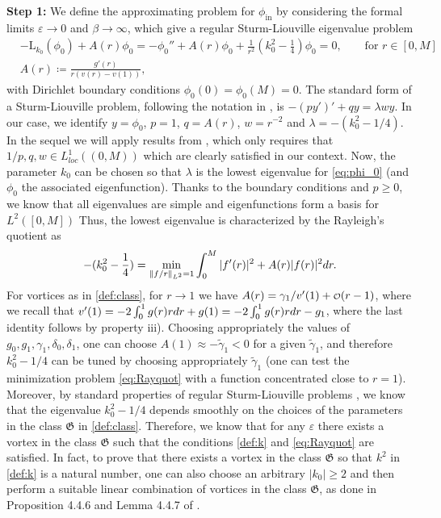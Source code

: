 \documentclass[11pt,reqno]{amsproc}
\def\dd{{\rm d}}
\def\eps{\varepsilon}
\newcommand{\rmin}{\mathrm{in}}
\newcommand{\rmL}{\mathrm{L}}
\newcommand\smallO{
  \mathchoice
    {{\scriptstyle\mathcal{O}}}%
    {{\scriptstyle\mathcal{O}}}%
    {{\scriptscriptstyle\mathcal{O}}}%
    {\scalebox{.7}{$\scriptscriptstyle\mathcal{O}$}}%
  }
\theoremstyle{definition}
\theoremstyle{definition}
\numberwithin{equation}{section}
\begin{document}
\medskip

\textbf{Step 1:} We define the approximating problem for  $\phi_{\rmin}$ by considering the formal limits $\eps\to 0$ and $\beta\to \infty$, which give a regular Sturm-Liouville eigenvalue problem
\begin{align}
\label{eq:phi_0}
&-\rmL_{k_0}(\phi_0) + A(r) \phi_0 = -\phi_0''+A(r)\phi_0+\frac{1}{r^2}(k_0^2-\frac14)\phi_0=0, \qquad \text{for } r\in [0,M]\\
\label{def:A}&A(r)\coloneqq\frac{g'(r)}{r(v(r)-v(1))},
\end{align}
with Dirichlet boundary conditions $\phi_0(0)=\phi_0(M)=0$. The standard form of a Sturm-Liouville problem, following the notation in \cite{Kong96}, is $-(py')'+qy=\lambda wy$. In our case, we  identify $y=\phi_0$, $p=1$, $q=A(r)$, $w=r^{-2}$ and $\lambda=-(k_0^2-1/4)$. In the sequel we will apply results from \cite{Kong96}, which only requires that $1/p,q,w\in L^1_{loc}((0,M))$ which are clearly satisfied in our context. Now, the parameter $k_0$ can be chosen so that $\lambda$ is the lowest eigenvalue for \cref{eq:phi_0} (and $\phi_0$ the associated eigenfunction). Thanks to the boundary conditions and $p\geq0$, we know that all eigenvalues are simple and eigenfunctions form a basis for $L^2([0,M])$ \cite{Kong96} Thus, the lowest eigenvalue is characterized by the Rayleigh's quotient as 
\begin{equation}
\label{eq:Rayquot}
    -(k_0^2-\frac14)=\min_{\|f/r\|_{L^2}=1} \int_0^{M}|f'(r)|^2+A(r)|f(r)|^2 \dd r.
\end{equation}
For vortices as in \cref{def:class}, for  $r\to 1$ we have $A(r)= \gamma_1/v'(1)+\smallO(r-1)$, where we recall that $v'(1)=-2\int_0^1g(r)r\dd r+g(1)=-2\int_0^1g(r)r\dd r-g_1$, where the last identity follows by property iii). Choosing appropriately the values of $g_0,g_1,\gamma_1, \delta_0,\delta_1$, one can choose $A(1)\approx -\widetilde{\gamma}_1<0$ for a given $\widetilde{\gamma}_1$,  and therefore $k_0^2-1/4$ can be tuned by choosing appropriately $\widetilde{\gamma}_1$ (one can test the minimization problem \cref{eq:Rayquot} with a function concentrated close to $r=1$). Moreover, by standard properties of regular Sturm-Liouville problems \cite{Kong96}, we know that the eigenvalue $k_0^2-1/4$ depends smoothly on the choices of the parameters in the class $\mathfrak{G}$ in \cref{def:class}. Therefore, we  know that for any $\eps$ there exists a  vortex in the class $\mathfrak{G}$ such that the conditions \cref{def:k} and \cref{eq:Rayquot} are satisfied. In fact, to prove that there exists a vortex in the class $\mathfrak{G}$ so that $k^2$ in \cref{def:k} is a natural number, one can also choose an arbitrary $|k_0|\geq 2$ and then perform a suitable linear combination of vortices in the class $\mathfrak{G}$, as done in Proposition 4.4.6 and Lemma 4.4.7 of \cite{vishik_notes}.
\end{document}

